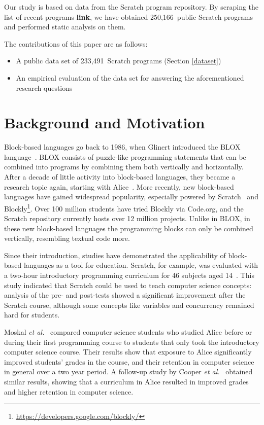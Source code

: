 \documentclass{sig-alternate}
\newcommand{\nPrograms}{250,166}
\newcommand{\nScriptPrograms}{233,491}
\newcommand{\todo}[1]{\textbf{#1}}
\begin{document}
Our study is based on data from the Scratch program repository. By scraping the list of recent programs \todo{link}, we have obtained \nPrograms~public Scratch programs and performed static analysis on them.

The contributions of this paper are as follows:

\begin{itemize}
	\item{A public data set of \nScriptPrograms~Scratch programs (Section \ref{dataset})}
	\item{An empirical evaluation of the data set for answering the aforementioned research questions}
\end{itemize}


\section{Background and Motivation}
\label{sec:background}
Block-based languages go back to 1986, when Glinert introduced the BLOX language~\cite{e._glinert_towards_1986}. BLOX consists of puzzle-like programming statements that can be combined into programs by combining them both vertically and horizontally. After a decade of little activity into block-based languages, they became a research topic again, starting with Alice~\cite{conway_alice:_1994}. More recently, new block-based languages have gained widespread popularity, especially powered by Scratch~\cite{resnick_scratch:_2009} and Blockly\footnote{\url{https://developers.google.com/blockly/}}. Over 100 million students have tried Blockly via Code.org, and the Scratch repository currently hosts over 12 million projects. Unlike in BLOX, in these new block-based languages the programming blocks can only be combined vertically, resembling textual code more.

Since their introduction, studies have demonstrated the applicability of block-based languages as a tool for education. Scratch, for example, was evaluated with a two-hour introductory programming curriculum for 46 subjects aged 14~\cite{meerbaum-salant_learning_2010}. This study indicated that Scratch could be used to teach computer science concepts: analysis of the pre- and post-tests showed a significant improvement after the Scratch course, although some concepts like variables and concurrency remained hard for students.

Moskal \emph{et al.}~\cite{b._moskal_evaluating_2005} compared computer science students who studied Alice before or during their first programming course to students that only took the introductory computer science course. Their results show that exposure to Alice significantly improved students' grades in the course, and their retention in computer science in general over a two year period. A follow-up study by Cooper \emph{et al.}~\cite{cooper_teaching_2003} obtained similar results, showing that a curriculum in Alice resulted in improved grades and higher retention in computer science.
\end{document}
